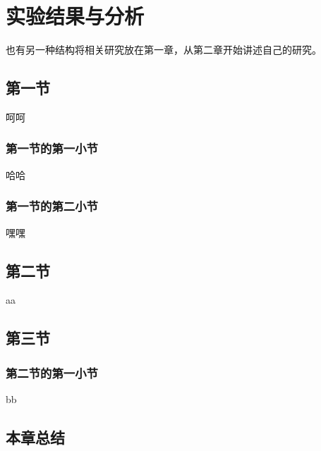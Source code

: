 
\chapter{实验结果与分析}

也有另一种结构将相关研究放在第一章，从第二章开始讲述自己的研究。

\section{第一节}

呵呵

\subsection{第一节的第一小节}

哈哈

\subsection{第一节的第二小节}

嘿嘿

\section{第二节}

aa

\section{第三节}

\subsection{第二节的第一小节}

bb

\section{本章总结}

\ifprint
\newpage
\thispagestyle{empty}
\mbox{}

\clearpage
\setcounter{page}{10}
\fi